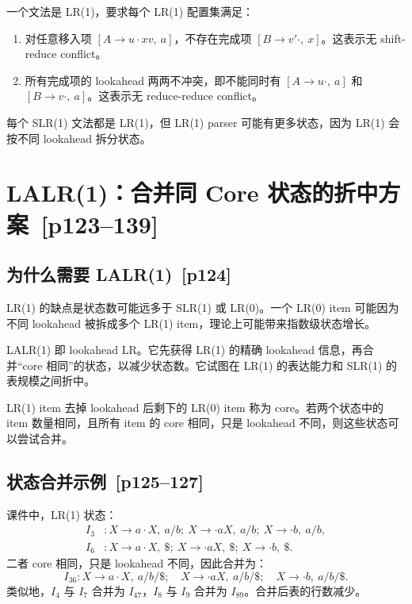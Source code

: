 \documentclass[UTF8,fontset=none,11pt]{ctexart}
\newenvironment{defbox}[1][]{%
  \par\medskip\noindent{\color{defrule}\rule{\linewidth}{1.1pt}}\par\nopagebreak
  \noindent{\bfseries\color{defrule}#1}\par\nopagebreak\smallskip}%
  {\par\nopagebreak\smallskip\noindent{\color{defrule}\rule{\linewidth}{0.4pt}}\par\medskip}
\newcommand{\pg}[1]{\texorpdfstring{{\small\color{graytext}\,[p#1]}}{ [p#1]}}
\begin{document}
一个文法是 LR(1)，要求每个 LR(1) 配置集满足：

\begin{enumerate}
  \item 对任意移入项 \([A\to u\cdot xv,\ a]\)，不存在完成项 \([B\to v'\cdot,\ x]\)。这表示无 shift-reduce conflict。
  \item 所有完成项的 lookahead 两两不冲突，即不能同时有 \([A\to u\cdot,\ a]\) 和 \([B\to v\cdot,\ a]\)。这表示无 reduce-reduce conflict。
\end{enumerate}

每个 SLR(1) 文法都是 LR(1)，但 LR(1) parser 可能有更多状态，因为 LR(1) 会按不同 lookahead 拆分状态。

\section{LALR(1)：合并同 Core 状态的折中方案 \pg{123--139}}

\subsection{为什么需要 LALR(1) \pg{124}}

LR(1) 的缺点是状态数可能远多于 SLR(1) 或 LR(0)。一个 LR(0) item 可能因为不同 lookahead 被拆成多个 LR(1) item，理论上可能带来指数级状态增长。

\begin{defbox}[LALR(1)]
LALR(1) 即 lookahead LR。它先获得 LR(1) 的精确 lookahead 信息，再合并“core 相同”的状态，以减少状态数。它试图在 LR(1) 的表达能力和 SLR(1) 的表规模之间折中。
\end{defbox}

\begin{defbox}[Core]
LR(1) item 去掉 lookahead 后剩下的 LR(0) item 称为 core。若两个状态中的 item 数量相同，且所有 item 的 core 相同，只是 lookahead 不同，则这些状态可以尝试合并。
\end{defbox}

\subsection{状态合并示例 \pg{125--127}}

课件中，LR(1) 状态：
\[
\begin{aligned}
I_3 &: X\to a\cdot X,\ a/b;\ X\to\cdot aX,\ a/b;\ X\to\cdot b,\ a/b,\\
I_6 &: X\to a\cdot X,\ \$;\ X\to\cdot aX,\ \$;\ X\to\cdot b,\ \$.
\end{aligned}
\]
二者 core 相同，只是 lookahead 不同，因此合并为：
\[
I_{36}: X\to a\cdot X,\ a/b/\$;\quad X\to\cdot aX,\ a/b/\$;\quad X\to\cdot b,\ a/b/\$.
\]
类似地，\(I_4\) 与 \(I_7\) 合并为 \(I_{47}\)，\(I_8\) 与 \(I_9\) 合并为 \(I_{89}\)。合并后表的行数减少。
\end{document}
